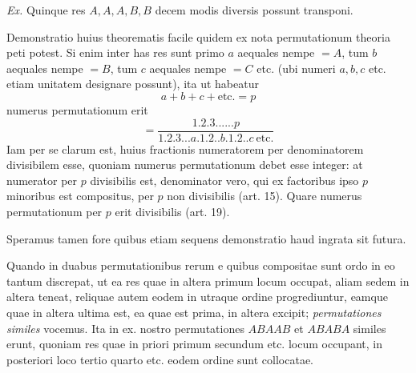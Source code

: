 \emph{Ex.} Quinque res $A,A,A,B,B$ decem modis diversis possunt transponi.

Demonstratio huius theorematis facile quidem ex nota permutationum theoria peti potest. Si enim inter has res sunt primo $a$ aequales nempe $=A$, tum $b$ aequales nempe $=B$, tum $c$ aequales nempe $=C$ etc. (ubi numeri $a,b,c$ etc. etiam unitatem designare possunt), ita ut habeatur
\[a+b+c+\mathrm{etc.}=p\]
numerus permutationum erit
\[=\frac{1.2.3......p}{1.2.3...a.1.2..b.1.2..c\ \mathrm{etc.}}\]
Iam per se clarum est, huius fractionis numeratorem per denominatorem divisibilem esse, quoniam numerus permutationum debet esse integer: at numerator per $p$ divisibilis est, denominator vero, qui ex factoribus ipso $p$ minoribus est compositus, per $p$ non divisibilis (art. 15). Quare numerus permutationum per $p$ erit divisibilis (art. 19).

Speramus tamen fore quibus etiam sequens demonstratio haud ingrata sit futura.

Quando in duabus permutationibus rerum e quibus compositae sunt ordo in eo tantum discrepat, ut ea res quae in altera primum locum occupat, aliam sedem in altera teneat, reliquae autem eodem in utraque ordine progrediuntur, eamque quae in altera ultima est, ea quae est prima, in altera excipit; \emph{permutationes similes} vocemus. Ita in ex. nostro permutationes $ABAAB$ et $ABABA$ similes erunt, quoniam res quae in priori primum secundum etc. locum occupant, in posteriori loco tertio quarto etc. eodem ordine sunt collocatae.
